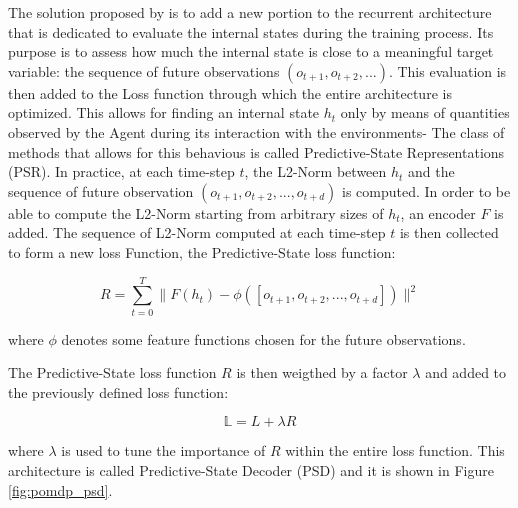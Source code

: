                 The solution proposed by  is to add a new portion to the recurrent architecture that is dedicated to evaluate the internal states during the training process. Its purpose is to assess how much the internal state is close to a meaningful target variable: the sequence of future observations $(o_{t+1}, o_{t+2}, ...)$. This evaluation is then added to the Loss function through which the entire architecture is optimized. This allows for finding an internal state $h_t$ only by means of quantities observed by the Agent during its interaction with the environments- The class of methods that allows for this behavious is called Predictive-State Representations (PSR). \newline
                In practice, at each time-step $t$, the L2-Norm between $h_t$ and the sequence of future observation $(o_{t+1}, o_{t+2}, ..., o_{t+d})$ is computed. In order to be able to compute the L2-Norm starting from arbitrary sizes of $h_t$, an encoder $F$ is added. The sequence of L2-Norm computed at each time-step $t$ is then collected to form a new loss Function, the Predictive-State loss function:
                
                \begin{definition}
                    \[ R = \sum_{t=0}^{T} \| F(h_t) - \phi([o_{t+1}, o_{t+2}, ..., o_{t+d}])\|^{2}\]
                    
                    where $\phi$ denotes some feature functions chosen for the future observations.
                \end{definition}
                
                \noindent
                The Predictive-State loss function $R$ is then weigthed by a factor $\lambda$ and added to the previously defined loss function:
                
                \[ \mathbb{L} = L + \lambda R\]
                
                where $\lambda$ is used to tune the importance of $R$ within the entire loss function. This architecture is called Predictive-State Decoder (PSD) and it is shown in Figure \ref{fig:pomdp_psd}. 
            
